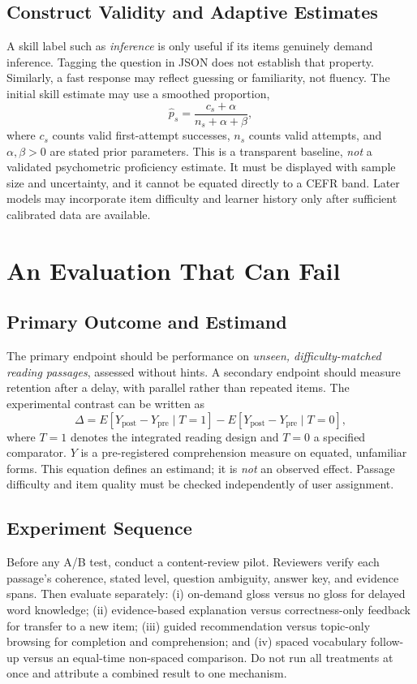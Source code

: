\documentclass[conference,10pt]{IEEEtran}
\begin{document}
\subsection{Construct Validity and Adaptive Estimates}
A skill label such as \emph{inference} is only useful if its items genuinely demand inference. Tagging the question in JSON does not establish that property. Similarly, a fast response may reflect guessing or familiarity, not fluency. The initial skill estimate may use a smoothed proportion,
\begin{equation}
\widehat{p}_{s}=\frac{c_s+\alpha}{n_s+\alpha+\beta},
\label{eq:mastery}
\end{equation}
where $c_s$ counts valid first-attempt successes, $n_s$ counts valid attempts, and $\alpha,\beta>0$ are stated prior parameters. This is a transparent baseline, \emph{not} a validated psychometric proficiency estimate. It must be displayed with sample size and uncertainty, and it cannot be equated directly to a CEFR band. Later models may incorporate item difficulty and learner history only after sufficient calibrated data are available.

\section{An Evaluation That Can Fail}
\subsection{Primary Outcome and Estimand}
The primary endpoint should be performance on \emph{unseen, difficulty-matched reading passages}, assessed without hints. A secondary endpoint should measure retention after a delay, with parallel rather than repeated items. The experimental contrast can be written as
\begin{equation}
\Delta=E[Y_{\mathrm{post}}-Y_{\mathrm{pre}}\mid T=1]-E[Y_{\mathrm{post}}-Y_{\mathrm{pre}}\mid T=0],
\label{eq:estimand}
\end{equation}
where $T=1$ denotes the integrated reading design and $T=0$ a specified comparator. $Y$ is a pre-registered comprehension measure on equated, unfamiliar forms. This equation defines an estimand; it is \emph{not} an observed effect. Passage difficulty and item quality must be checked independently of user assignment.

\subsection{Experiment Sequence}
Before any A/B test, conduct a content-review pilot. Reviewers verify each passage's coherence, stated level, question ambiguity, answer key, and evidence spans. Then evaluate separately: (i) on-demand gloss versus no gloss for delayed word knowledge; (ii) evidence-based explanation versus correctness-only feedback for transfer to a new item; (iii) guided recommendation versus topic-only browsing for completion and comprehension; and (iv) spaced vocabulary follow-up versus an equal-time non-spaced comparison. Do not run all treatments at once and attribute a combined result to one mechanism.
\end{document}
